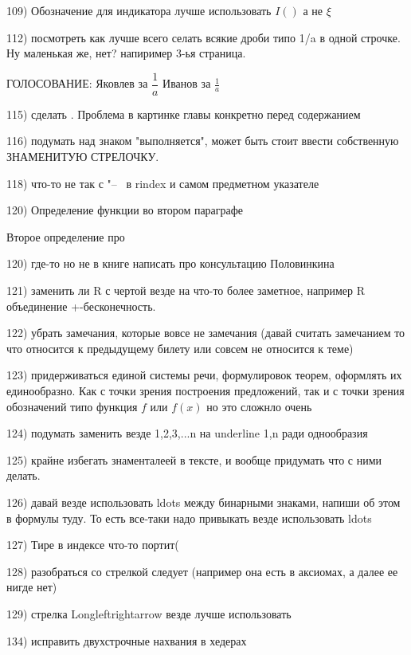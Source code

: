 109) Обозначение для индикатора лучше использовать $I()$ а не $\xi$

112) посмотреть как лучше всего селать всякие дроби типо 1/a  в одной строчке. Ну маленькая же, нет? напиример 3-ья страница.

ГОЛОСОВАНИЕ: 
Яковлев за $\dfrac{1}{a}$
Иванов за $\frac{1}{a}$

115) сделать . Проблема в картинке главы конкретно перед содержанием

116) подумать над знаком "выполняется", может быть стоит ввести собственную ЗНАМЕНИТУЮ СТРЕЛОЧКУ.

118) что-то не так с "--~ в rindex и самом предметном указателе

120) Определение функции во втором параграфе 

Второе определение про 
\begin{defnn}
\end{defnn}

120) где-то но не в книге написать про консультацию Половинкина

121) заменить ли R с чертой везде на что-то более заметное, например R объединение +-бесконечность.

122) убрать замечания, которые вовсе не замечания (давай считать замечанием то что относится к предыдущему билету или совсем не относится к теме)

123) придерживаться единой системы речи, формулировок теорем, оформлять их единообразно. Как с точки зрения построения предложений, так и с точки зрения обозначений типо функция $f$ или $f(x)$ но это сложнло очень

124) подумать заменить везде 1,2,3,...n на underline 1,n ради однообразия

125) крайне избегать знаменталеей в тексте, и вообще придумать что с ними делать.

126) давай везде использовать ldots между бинарными знаками, напиши об этом в формулы туду. То есть все-таки надо привыкать везде использовать ldots

127) Тире в индексе что-то портит(

128) разобраться со стрелкой следует (например она есть в аксиомах, а далее ее нигде нет)

129) стрелка Longleftrightarrow везде лучше использовать

134) исправить двухстрочные нахвания в хедерах

